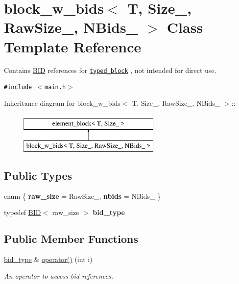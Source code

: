 \hypertarget{classblock__w__bids}{
\section{block\_\-w\_\-bids$<$ T, Size\_\-, RawSize\_\-, NBids\_\- $>$ Class Template Reference}
\label{classblock__w__bids}
}
Contains \hyperlink{structBID}{BID} references for {\tt \hyperlink{classtyped__block}{typed\_\-block}} , not intended for direct use.  


{\tt \#include $<$main.h$>$}

Inheritance diagram for block\_\-w\_\-bids$<$ T, Size\_\-, RawSize\_\-, NBids\_\- $>$::\begin{figure}[H]
\begin{center}
\leavevmode
\includegraphics[height=2cm]{classblock__w__bids}
\end{center}
\end{figure}
\subsection*{Public Types}
\begin{CompactItemize}
\item 
enum \{ \textbf{raw\_\-size} =  RawSize\_\-, 
\textbf{nbids} =  NBids\_\-
 \}
\item 
\hypertarget{group__mnglayer_g3418b30447bfa7129dabe6682e1df1a7}{
typedef \hyperlink{structBID}{BID}$<$ raw\_\-size $>$ \textbf{bid\_\-type}}
\label{group__mnglayer_g3418b30447bfa7129dabe6682e1df1a7}

\end{CompactItemize}
\subsection*{Public Member Functions}
\begin{CompactItemize}
\item 
\hypertarget{group__mnglayer_gf8ec031f551ea91964414679972173fd}{
\hyperlink{structBID}{bid\_\-type} \& \hyperlink{group__mnglayer_gf8ec031f551ea91964414679972173fd}{operator()} (int i)}
\label{group__mnglayer_gf8ec031f551ea91964414679972173fd}

\begin{CompactList}\small\item\em An operator to access bid references. \item\end{CompactList}\end{CompactItemize}
